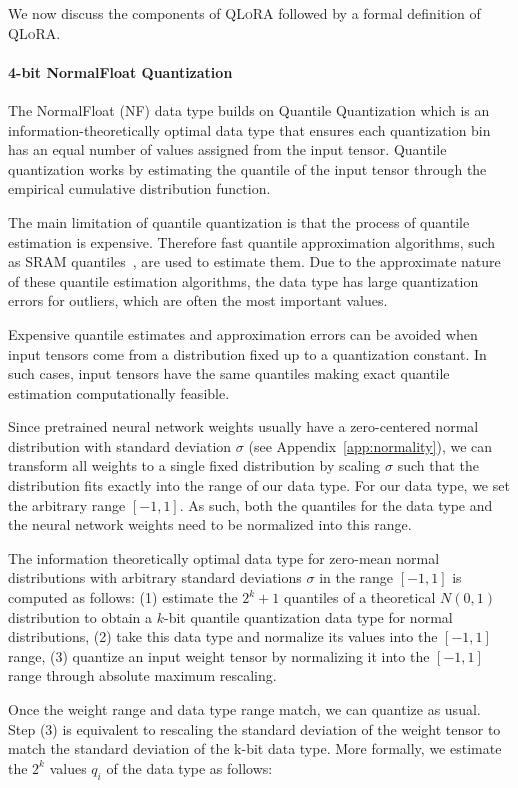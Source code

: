 \documentclass{article}
\newcommand{\method}{\textsc{QLoRA}\xspace}
\begin{document}
We now discuss the components of \method followed by a formal definition of \method.


\paragraph{4-bit NormalFloat Quantization} The NormalFloat (NF) data type builds on Quantile Quantization \citep{dettmers2022optimizers} which is an information-theoretically optimal data type that ensures each quantization bin has an equal number of values assigned from the input tensor. Quantile quantization works by estimating the quantile of the input tensor through the empirical cumulative distribution function. 

The main limitation of quantile quantization is that the process of quantile estimation is expensive. Therefore fast quantile approximation algorithms, such as SRAM quantiles~\citep{dettmers2022optimizers}, are used to estimate them. Due to the approximate nature of these quantile estimation algorithms, the data type has large quantization errors for outliers, which are often the most important values.

Expensive quantile estimates and approximation errors can be avoided when input tensors come from a distribution fixed up to a quantization constant. In such cases, input tensors have the same quantiles making exact quantile estimation computationally feasible.

Since pretrained neural network weights usually have a zero-centered normal distribution with standard deviation $\sigma$ (see Appendix~\ref{app:normality}), we can transform all weights to a single fixed distribution by scaling $\sigma$ such that the distribution fits exactly into the range of our data type. For our data type, we set the arbitrary range $[-1, 1]$. As such, both the quantiles for the data type and the neural network weights need to be normalized into this range.

The information theoretically optimal data type for zero-mean normal distributions with arbitrary standard deviations $\sigma$ in the range $[-1, 1]$ is computed as follows: (1) estimate the $2^k+1$ quantiles of a theoretical $N(0, 1)$ distribution to obtain a $k$-bit quantile quantization data type for normal distributions, (2) take this data type and normalize its values into the $[-1, 1]$ range, (3) quantize an input weight tensor by normalizing it into the $[-1, 1]$ range through absolute maximum rescaling. 

Once the weight range and data type range match, we can quantize as usual. Step (3) is equivalent to rescaling the standard deviation of the weight tensor to match the standard deviation of the k-bit data type. More formally, we estimate the $2^k$ values $q_i$ of the data type as follows: 
\end{document}
